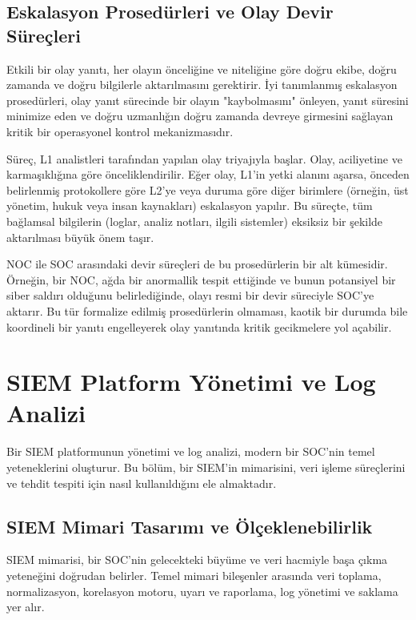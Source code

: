 \subsection{Eskalasyon Prosedürleri ve Olay Devir Süreçleri}

Etkili bir olay yanıtı, her olayın önceliğine ve niteliğine göre doğru ekibe, doğru zamanda ve doğru bilgilerle aktarılmasını gerektirir. İyi tanımlanmış eskalasyon prosedürleri, olay yanıt sürecinde bir olayın "kaybolmasını" önleyen, yanıt süresini minimize eden ve doğru uzmanlığın doğru zamanda devreye girmesini sağlayan kritik bir operasyonel kontrol mekanizmasıdır.

Süreç, L1 analistleri tarafından yapılan olay triyajıyla başlar. Olay, aciliyetine ve karmaşıklığına göre önceliklendirilir. Eğer olay, L1'in yetki alanını aşarsa, önceden belirlenmiş protokollere göre L2'ye veya duruma göre diğer birimlere (örneğin, üst yönetim, hukuk veya insan kaynakları) eskalasyon yapılır. Bu süreçte, tüm bağlamsal bilgilerin (loglar, analiz notları, ilgili sistemler) eksiksiz bir şekilde aktarılması büyük önem taşır.

NOC ile SOC arasındaki devir süreçleri de bu prosedürlerin bir alt kümesidir. Örneğin, bir NOC, ağda bir anormallik tespit ettiğinde ve bunun potansiyel bir siber saldırı olduğunu belirlediğinde, olayı resmi bir devir süreciyle SOC'ye aktarır. Bu tür formalize edilmiş prosedürlerin olmaması, kaotik bir durumda bile koordineli bir yanıtı engelleyerek olay yanıtında kritik gecikmelere yol açabilir.

\section{SIEM Platform Yönetimi ve Log Analizi}

Bir SIEM platformunun yönetimi ve log analizi, modern bir SOC'nin temel yeteneklerini oluşturur. Bu bölüm, bir SIEM'in mimarisini, veri işleme süreçlerini ve tehdit tespiti için nasıl kullanıldığını ele almaktadır.

\subsection{SIEM Mimari Tasarımı ve Ölçeklenebilirlik}

SIEM mimarisi, bir SOC'nin gelecekteki büyüme ve veri hacmiyle başa çıkma yeteneğini doğrudan belirler. Temel mimari bileşenler arasında veri toplama, normalizasyon, korelasyon motoru, uyarı ve raporlama, log yönetimi ve saklama yer alır.

